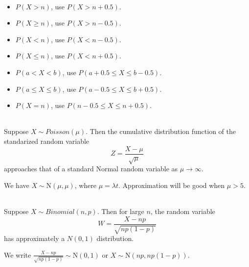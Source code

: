 \begin{proposition}
    \phantom{}\
    \begin{itemize}
        \item $P(X > n)$, use $P(X > n + 0.5)$.
        \item $P(X \geq n)$, use $P(X > n - 0.5)$.
        \item $P(X < n)$, use $P(X < n - 0.5)$.
        \item $P(X \leq n)$, use $P(X < n + 0.5)$.
        \item $P(a < X < b)$, use $P(a + 0.5 \leq X \leq b - 0.5)$.
        \item $P(a \leq X \leq b)$, use $P(a - 0.5 \leq X \leq b + 0.5)$.
        \item $P(X = n)$, use $P(n-0.5 \leq X \leq n + 0.5)$.
    \end{itemize}
\end{proposition}

\begin{theorem}
    \phantom{}  \\
    Suppose $X \sim Poisson(\mu)$. Then the cumulative distribution function of the standarized
    random variable \vspace{-2mm}
    \[Z = \frac{X - \mu}{\sqrt{\mu}}\]
    approaches that of a standard Normal random variable as $\mu \to \infty$.
\end{theorem}

\begin{remark}
    We have $X \sim \text{N}(\mu,\mu)$, where $\mu = \lambda t$. Approximation will be good when $\mu > 5$.
\end{remark}

\begin{theorem}
    \phantom{}  \\
    Suppose $X \sim Binomial(n, p)$. Then for large $n$, the random variable \vspace{-1mm}
    \[W = \frac{X - np}{\sqrt{np(1 - p)}}\]
    has approximately a $N(0, 1)$ distribution.
\end{theorem}

\begin{remark}
    We write $\frac{X - np}{\sqrt{np(1 - p)}} \sim \text{N}(0,1)$ or $X \sim \text{N}(np,np(1-p))$. \vspace{-1mm} \\
\end{remark}


